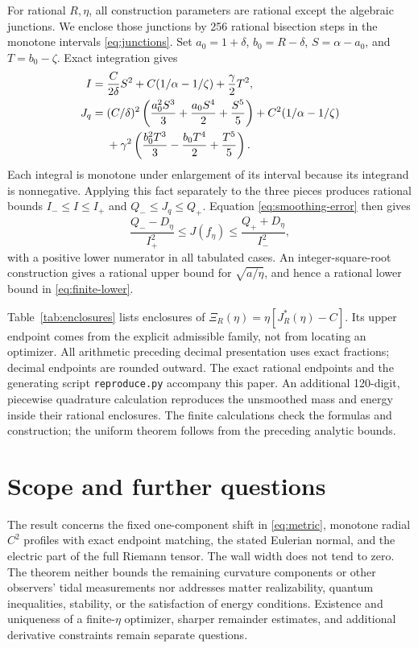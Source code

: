 \documentclass[11pt,a4paper]{article}
\numberwithin{equation}{section}
\begin{document}
For rational \(R,\eta\), all construction parameters are rational except
the algebraic junctions. We enclose those junctions by 256 rational
bisection steps in the monotone intervals \eqref{eq:junctions}.
Set \(a_0=1+\delta\), \(b_0=R-\delta\),
\(S=\alpha-a_0\), and \(T=b_0-\zeta\). Exact integration gives
\begin{align}
 I={}&\frac{C}{2\delta}S^2
       +C(1/\alpha-1/\zeta)+\frac{\gamma}{2}T^2,\label{eq:exact-I}\\
 J_q={}&(C/\delta)^2
       \left(\frac{a_0^2S^3}{3}+\frac{a_0S^4}{2}+\frac{S^5}{5}\right)
       +C^2(1/\alpha-1/\zeta)\notag\\
     &+\gamma^2
       \left(\frac{b_0^2T^3}{3}-\frac{b_0T^4}{2}+\frac{T^5}{5}\right).
       \label{eq:exact-J}
\end{align}
Each integral is monotone under enlargement of its interval because its
integrand is nonnegative. Applying this fact separately to the three
pieces produces rational bounds \(I_-\le I\le I_+\) and
\(Q_-\le J_q\le Q_+\). Equation \eqref{eq:smoothing-error} then gives
\begin{equation}\label{eq:rational-upper}
 \frac{Q_--D_\eta}{I_+^2}\le J(f_\eta)
 \le\frac{Q_++D_\eta}{I_-^2},
\end{equation}
with a positive lower numerator in all tabulated cases.
An integer-square-root construction gives a rational upper bound for
\(\sqrt{a/\eta}\), and hence a rational lower bound in
\eqref{eq:finite-lower}.

Table~\ref{tab:enclosures} lists enclosures of
\(\Xi_R(\eta)=\eta[J_R^*(\eta)-C]\).
Its upper endpoint comes from the explicit admissible family, not from
locating an optimizer. All arithmetic preceding decimal presentation
uses exact fractions; decimal endpoints are rounded outward.
The exact rational endpoints and the generating script
\texttt{reproduce.py} accompany this paper.
An additional 120-digit, piecewise quadrature calculation reproduces the
unsmoothed mass and energy inside their rational enclosures.
The finite calculations check the formulas and construction; the
uniform theorem follows from the preceding analytic bounds.



\section{Scope and further questions}

The result concerns the fixed one-component shift in
\eqref{eq:metric}, monotone radial \(C^2\) profiles with exact endpoint
matching, the stated Eulerian normal, and the electric part of the full
Riemann tensor. The wall width does not tend to zero. The theorem neither
bounds the remaining curvature components or other observers' tidal
measurements nor addresses matter realizability, quantum inequalities,
stability, or the satisfaction of energy conditions. Existence and
uniqueness of a finite-\(\eta\) optimizer, sharper remainder estimates,
and additional derivative constraints remain separate questions.
\end{document}
